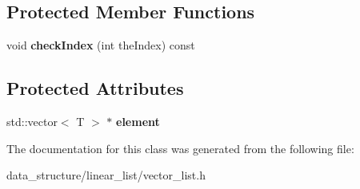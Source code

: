 \subsection*{Protected Member Functions}
\begin{DoxyCompactItemize}
\item 
\mbox{\label{classVectorList_adf7ba2201d2f8fb3b85e7ba2bdd04e14}} 
void {\bfseries check\+Index} (int the\+Index) const
\end{DoxyCompactItemize}
\subsection*{Protected Attributes}
\begin{DoxyCompactItemize}
\item 
\mbox{\label{classVectorList_a5e800cced373d2fe09c57ec9ef128004}} 
std\+::vector$<$ T $>$ $\ast$ {\bfseries element}
\end{DoxyCompactItemize}


The documentation for this class was generated from the following file\+:\begin{DoxyCompactItemize}
\item 
data\+\_\+structure/linear\+\_\+list/vector\+\_\+list.\+h\end{DoxyCompactItemize}
